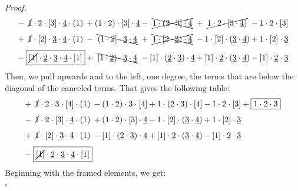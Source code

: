 \documentclass[12pt,reqno]{amsart}
\theoremstyle{article}
\renewenvironment{proof}{\noindent \textit{Proof.}} {\nolinebreak\hfill $\square$}
\newcommand{\ul}{\underline}
\begin{document}
\begin{proof}
$$\begin{array}{c@{\hspace{2pt}}c@{\hspace{2pt}}c@{\hspace{2pt}}c@{\hspace{2pt}}c@{\hspace{2pt}}c@{\hspace{2pt}}c@{\hspace{2pt}}c@{\hspace{2pt}}c@{\hspace{2pt}}c}
      - & \cancel 1\cdot 2\cdot [3]\cdot \ul4\cdot(1)                  & + & (1\cdot 2)\cdot [3]\cdot \ul4                & - & \xcancel{1\cdot (2\cdot 3]\cdot\ul4}      & + & \cancel{1\cdot 2\cdot [3\cdot \ul4)} & - & 1\cdot 2\cdot [3] \\[.25cm]
      + & \cancel 1\cdot [2]\cdot \ul3\cdot \ul4\cdot(1)               & - & \bcancel{(1\cdot 2]\cdot \ul3 \cdot \ul4}    & + & \xcancel{1\cdot [2 \cdot \ul3)\cdot\ul4}  & - & 1\cdot [2]\cdot (\ul3\cdot \ul4)     & + & 1\cdot [2]\cdot \ul3 \\[.25cm]
      - &  \fbox{$\cancel{[1]}\cdot \ul2\cdot \ul3\cdot \ul4\cdot[1]$} & + & \bcancel{[1\cdot \ul2)\cdot \ul3 \cdot \ul4} & - & [1] \cdot (\ul2 \cdot \ul3)\cdot\ul4      & + & [1]\cdot \ul2\cdot (\ul3\cdot \ul4)  & - & [1]\cdot \ul2\cdot \ul3
    \end{array}
    $$
    Then,
    we pull upwards and to the left, one degree, the terms that are below the diagonal of the canceled terms.
    That gives the following table:
    $$
    \begin{array}{c@{\hspace{2pt}}c@{\hspace{2pt}}c@{\hspace{2pt}}c@{\hspace{2pt}}c@{\hspace{2pt}}c@{\hspace{2pt}}c@{\hspace{2pt}}c@{\hspace{2pt}}c@{\hspace{2pt}}c}
      + & \cancel 1\cdot 2\cdot 3\cdot [4]\cdot(1)                     & - & (1\cdot 2)\cdot 3\cdot [4]              & + & 1\cdot (2\cdot 3)\cdot[4]             & - & 1\cdot 2\cdot [3]        & + & \fbox{$1\cdot 2\cdot 3$} \\[.25cm]
      - & \cancel 1\cdot 2\cdot [3]\cdot \ul4\cdot(1)                  & + & (1\cdot 2)\cdot [3]\cdot \ul4           & - & 1\cdot [2]\cdot (\ul3\cdot \ul4)      & + & 1\cdot [2]\cdot \ul3     &   &  \\[.25cm]
      + & \cancel 1\cdot [2]\cdot \ul3\cdot \ul4\cdot(1)               & - & [1] \cdot (\ul2 \cdot \ul3)\cdot\ul4    & + & [1]\cdot \ul2\cdot (\ul3\cdot \ul4)   & - &  [1]\cdot \ul2\cdot \ul3 &   &  \\[.25cm]
      - &  \fbox{$\cancel{[1]}\cdot \ul2\cdot \ul3\cdot \ul4\cdot[1]$} &  & &  &      &  &   &  &
    \end{array}
    $$
    Beginning with the framed elements,
    we get:
    $$
$$
\end{proof}
\end{document}
